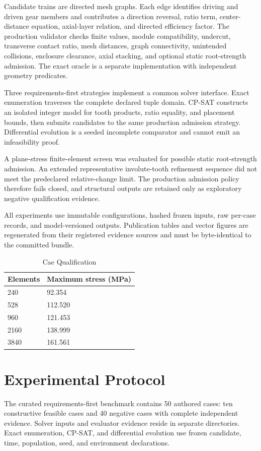 \documentclass[preprint,12pt]{elsarticle}
\begin{document}
Candidate trains are directed mesh graphs. Each edge identifies driving and driven gear members and contributes a direction reversal, ratio term, center-distance equation, axial-layer relation, and directed efficiency factor. The production validator checks finite values, module compatibility, undercut, transverse contact ratio, mesh distances, graph connectivity, unintended collisions, enclosure clearance, axial stacking, and optional static root-strength admission. The exact oracle is a separate implementation with independent geometry predicates.

Three requirements-first strategies implement a common solver interface. Exact enumeration traverses the complete declared tuple domain. CP-SAT constructs an isolated integer model for tooth products, ratio equality, and placement bounds, then submits candidates to the same production admission strategy. Differential evolution is a seeded incomplete comparator and cannot emit an infeasibility proof.

A plane-stress finite-element screen was evaluated for possible static root-strength admission. An extended representative involute-tooth refinement sequence did not meet the predeclared relative-change limit. The production admission policy therefore fails closed, and structural outputs are retained only as exploratory negative qualification evidence.

All experiments use immutable configurations, hashed frozen inputs, raw per-case records, and model-versioned outputs. Publication tables and vector figures are regenerated from their registered evidence sources and must be byte-identical to the committed bundle.

\begin{table}[htbp]
\centering
\caption{Cae Qualification}
\small
\begin{tabular}{ll}
\textbf{Elements} & \textbf{Maximum stress (MPa)} \\
\hline
240 & 92.354 \\
528 & 112.520 \\
960 & 121.453 \\
2160 & 138.999 \\
3840 & 161.561 \\
\end{tabular}
\end{table}
\section{Experimental Protocol}
The curated requirements-first benchmark contains 50 authored cases: ten constructive feasible cases and 40 negative cases with complete independent evidence. Solver inputs and evaluator evidence reside in separate directories. Exact enumeration, CP-SAT, and differential evolution use frozen candidate, time, population, seed, and environment declarations.
\end{document}
